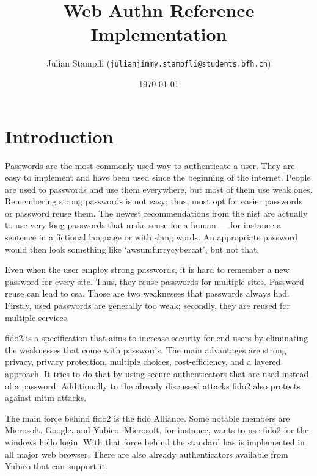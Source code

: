 \documentclass[a4paper, 11pt]{scrartcl}
\begin{document}
\title{Web Authn Reference Implementation}
\date{\today} 
\author{ Julian Stampfli (\texttt{julianjimmy.stampfli@students.bfh.ch}) }
\maketitle
\setcounter{tocdepth}{2}
\tableofcontents
\clearpage

\section{Introduction}

Passwords are the most commonly used way to authenticate a user. They are easy to implement and have been used since the beginning of the internet. People are used to passwords and use them everywhere, but most of them use weak ones. Remembering strong passwords is not easy; thus, most opt for easier passwords or password reuse them. The newest recommendations from the \gls{nist} are actually to use very long passwords that make sense for a human — for instance a sentence in a fictional language or with slang words. An appropriate password would then look something like `awsumfurrycybercat', but not that. \cite{nist:pw:blog}

Even when the user employ strong passwords, it is hard to remember a new password for every site. Thus, they reuse passwords for multiple sites. Password reuse can lead to \gls{csa}. \cite{panda:pwreuse, xkcd:pwreuse} Those are two weaknesses that passwords always had. Firstly, used passwords are generally too weak; secondly, they are reused for multiple services. 

\gls{fido2} is a specification that aims to increase security for end users by eliminating the weaknesses that come with passwords. The main advantages are strong privacy, privacy protection, multiple choices, cost-efficiency, and a layered approach. It tries to do that by using secure authenticators that are used instead of a password.  Additionally to the already discussed attacks \gls{fido2} also protects against \gls{mitm} attacks. \cite{yubico:whatIsFido2} 

The main force behind \gls{fido2} is the \gls{fido} Alliance. Some notable members are Microsoft, Google, and Yubico. Microsoft, for instance, wants to use \gls{fido2} for the windows hello login. \cite{yubico:ms} With that force behind the standard has is implemented in all major web browser. \cite{fido:browser} There are also already authenticators available from Yubico that can support it. \cite{yubico:yubikey5}
\end{document}
